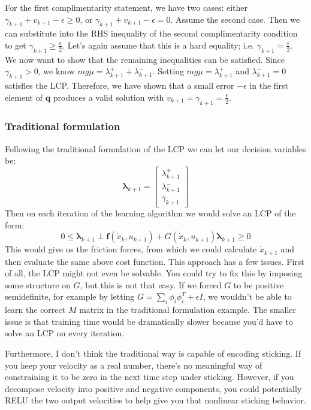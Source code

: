 \documentclass{article}
\renewcommand{\vec}[1]{\boldsymbol{#1}}
\begin{document}
For the first complimentarity statement, we have two cases: either $\gamma_{k+1} + v_{k+1} - \epsilon \geq 0$, or $\gamma_{k+1} + v_{k+1} - \epsilon = 0$. Assume the second case. Then we can substitute into the RHS inequality of the second complimentarity condition to get $\gamma_{k+1} \geq \frac{\epsilon}{2}$. Let's again assume that this is a hard equality; i.e. $\gamma_{k+1} = \frac{\epsilon}{2}$. We now want to show that the remaining inequalities can be satisfied. Since $\gamma_{k+1} > 0$, we know $m g \mu = \lambda^+_{k+1} + \lambda^-_{k+1}$. Setting $m g \mu = \lambda^+_{k+1}$ and $\lambda^-_{k+1} = 0$ satisfies the LCP. Therefore, we have shown that a small error $-\epsilon$ in the first element of $\vec{q}$ produces a valid solution with $v_{k+1} = \gamma_{k+1} = \frac{\epsilon}{2}$. 

\subsubsection{Traditional formulation}
Following the traditional formulation of the LCP we can let our decision variables be:
\[
    \vec{\lambda}_{k+1} =
    \begin{bmatrix}
        \lambda^+_{k+1} \\
        \lambda^-_{k+1} \\
        \gamma_{k+1}
    \end{bmatrix}
\]
Then on each iteration of the learning algorithm we would solve an LCP of the form:
\[
    0 \leq \vec{\lambda}_{k+1} \perp \vec{f}(\dot x_k, u_{k+1}) + G(\dot x_k, u_{k+1}) \vec{\lambda}_{k+1} \geq 0
\]
This would give us the friction forces, from which we could calculate $\dot x_{k+1}$ and then evaluate the same above cost function. This approach has a few issues. First of all, the LCP might not even be solvable. You could try to fix this by imposing some structure on $G$, but this is not that easy. If we forced $G$ to be positive semidefinite, for example by letting $G = \sum _i \phi_i \phi_i^T + \epsilon I$, we wouldn't be able to learn the correct $M$ matrix in the traditional formulation example. The smaller issue is that training time would be dramatically slower because you'd have to solve an LCP on every iteration.

Furthermore, I don't think the traditional way is capable of encoding sticking. If you keep your velocity as a real number, there's no meaningful way of constraining it to be zero in the next time step under sticking. However, if you decompose velocity into positive and negative components, you could potentially RELU the two output velocities to help give you that nonlinear sticking behavior.
\end{document}

